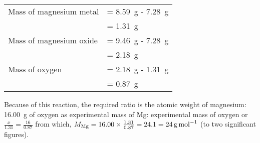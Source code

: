\documentclass{article}
\begin{document}
\begin{tabular}{ll}
Mass of magnesium metal & = \SI{8.59}{\gram} - \SI{7.28}{\gram}\\
& = \SI{1.31}{\gram}\\
Mass of magnesium oxide & = \SI{9.46}{\gram} - \SI{7.28}{\gram}\\
& = \SI{2.18}{\gram}\\
Mass of oxygen & = \SI{2.18}{\gram} - \SI{1.31}{\gram}\\
& = \SI{0.87}{\gram}
\end{tabular}

Because of this reaction, the required ratio is the atomic weight of magnesium: \SI{16.00}{\gram} of oxygen as experimental mass of Mg: experimental mass of oxygen or $\frac{x}{1.31}=\frac{16}{0.87}$ from which, $M_{\ce{Mg}} = 16.00 \times \frac{1.31}{0.87} = 24.1 = \SI{24}{\gram\per\mole}$ (to two significant figures).


%

%

\end{document}

